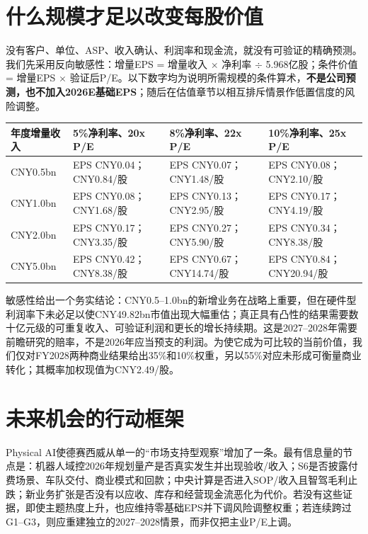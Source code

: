 \section{什么规模才足以改变每股价值}

没有客户、单位、ASP、收入确认、利润率和现金流，就没有可验证的精确预测。我们先采用反向敏感性：增量EPS = 增量收入 $\times$ 净利率 $\div$ 5.968亿股；条件价值 = 增量EPS $\times$ 验证后P/E。以下数字均为说明所需规模的条件算术，\textbf{不是公司预测，也不加入2026E基础EPS}；随后在估值章节以相互排斥情景作低置信度的风险调整。

\begin{exhibitbox}
\small
\begin{tabularx}{\textwidth}{L{2.6cm}Y Y Y}
\toprule
年度增量收入 & 5\%净利率、20x P/E & 8\%净利率、22x P/E & 10\%净利率、25x P/E \\
\midrule
CNY0.5bn & EPS CNY0.04；CNY0.84/股 & EPS CNY0.07；CNY1.48/股 & EPS CNY0.08；CNY2.10/股 \\
CNY1.0bn & EPS CNY0.08；CNY1.68/股 & EPS CNY0.13；CNY2.95/股 & EPS CNY0.17；CNY4.19/股 \\
CNY2.0bn & EPS CNY0.17；CNY3.35/股 & EPS CNY0.27；CNY5.90/股 & EPS CNY0.34；CNY8.38/股 \\
CNY5.0bn & EPS CNY0.42；CNY8.38/股 & EPS CNY0.67；CNY14.74/股 & EPS CNY0.84；CNY20.94/股 \\
\bottomrule
\end{tabularx}
\end{exhibitbox}

敏感性给出一个务实结论：CNY0.5--1.0bn的新增业务在战略上重要，但在硬件型利润率下未必足以使CNY49.82bn市值出现大幅重估；真正具有凸性的结果需要数十亿元级的可重复收入、可验证利润和更长的增长持续期。这是2027--2028年需要前瞻研究的赔率，不是2026年应当预支的利润。为使它成为可比较的当前价值，我们仅对FY2028两种商业结果给出35\%和10\%权重，另以55\%对应未形成可衡量商业转化；其概率加权现值为CNY2.49/股。

\section{未来机会的行动框架}

Physical AI使德赛西威从单一的``市场支持型观察''增加了一条。最有信息量的节点是：机器人域控2026年规划量产是否真实发生并出现验收/收入；S6是否披露付费场景、车队交付、商业模式和回款；中央计算是否进入SOP/收入且智驾毛利止跌；新业务扩张是否没有以应收、库存和经营现金流恶化为代价。若没有这些证据，即使主题热度上升，也应维持零基础EPS并下调风险调整权重；若连续跨过G1--G3，则应重建独立的2027--2028情景，而非仅把主业P/E上调。

